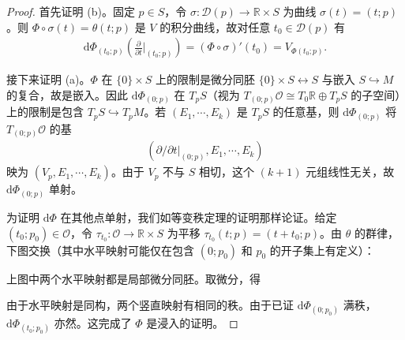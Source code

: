 \documentclass[../../main.tex]{subfiles}
\begin{document}
\begin{proof}
首先证明 (b)。固定 $p\in S$，令 $\sigma\colon\mathscr{D}(p)\to\mathbb{R}\times S$ 为曲线 $\sigma(t)=(t;p)$。则 $\Phi\circ\sigma(t)=\theta(t;p)$ 是 $V$ 的积分曲线，故对任意 $t_0\in\mathscr{D}(p)$ 有
\begin{align}
\mathrm{d}\Phi_{(t_0;p)}\left(\frac{\partial}{\partial t}\bigg|_{(t_0;p)}\right)=(\Phi\circ\sigma)'(t_0)=V_{\Phi(t_0;p)}. \label{align:ch09-10}
\end{align}

接下来证明 (a)。$\Phi$ 在 $\{0\}\times S$ 上的限制是微分同胚 $\{0\}\times S\leftrightarrow S$ 与嵌入 $S\hookrightarrow M$ 的复合，故是嵌入。因此 $\mathrm{d}\Phi_{(0;p)}$ 在 $T_pS$（视为 $T_{(0;p)}\mathcal{O}\cong T_0\mathbb{R}\oplus T_pS$ 的子空间）上的限制是包含 $T_pS\hookrightarrow T_pM$。若 $(E_1,\cdots ,E_k)$ 是 $T_pS$ 的任意基，则 $\mathrm{d}\Phi_{(0;p)}$ 将 $T_{(0;p)}\mathcal{O}$ 的基
\begin{align*}
\left(\partial/\partial t\big|_{(0;p)},E_1,\cdots ,E_k\right)
\end{align*}
映为 $(V_p,E_1,\cdots ,E_k)$。由于 $V_p$ 不与 $S$ 相切，这个 $(k+1)$ 元组线性无关，故 $\mathrm{d}\Phi_{(0;p)}$ 单射。

为证明 $\mathrm{d}\Phi$ 在其他点单射，我们如等变秩定理的证明那样论证。给定 $(t_0;p_0)\in\mathcal{O}$，令 $\tau_{t_0}\colon\mathcal{O}\to\mathbb{R}\times S$ 为平移 $\tau_{t_0}(t;p)=(t+t_0;p)$。由 $\theta$ 的群律，下图交换（其中水平映射可能仅在包含 $(0;p_0)$ 和 $p_0$ 的开子集上有定义）：
\begin{center}
\end{center}
上图中两个水平映射都是局部微分同胚。取微分，得
\begin{center}
\end{center}
由于水平映射是同构，两个竖直映射有相同的秩。由于已证 $\mathrm{d}\Phi_{(0;p_0)}$ 满秩，$\mathrm{d}\Phi_{(t_0;p_0)}$ 亦然。这完成了 $\Phi$ 是浸入的证明。


\end{proof}
\end{document}
